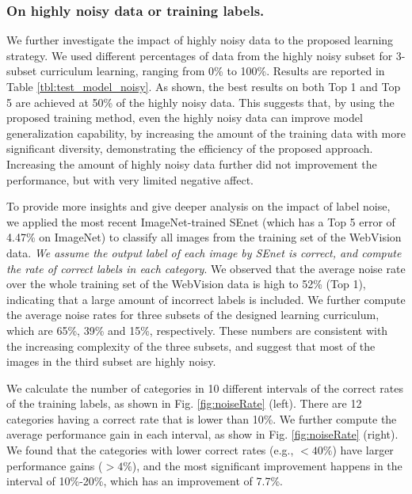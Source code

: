 \documentclass[runningheads]{llncs}
\begin{document}
\subsubsection{On highly noisy data or training labels.}
We further investigate the impact of highly noisy data to the proposed learning strategy. We used different percentages of data from the highly noisy subset for 3-subset curriculum learning, ranging from 0\% to 100\%. Results are reported in Table \ref{tbl:test_model_noisy}. As shown, the best results on both Top 1 and Top 5 are achieved at 50\% of the highly noisy data. This suggests that, by using the proposed training method, even the highly noisy data can improve model generalization capability, by increasing the amount of the training data with more significant diversity, demonstrating the efficiency of the proposed approach. Increasing the amount of highly noisy data further did not improvement the performance, but with very limited negative affect.

To provide more insights and give deeper analysis on the impact of label noise, we applied the most recent ImageNet-trained SEnet \cite{hu2017squeeze} (which has a Top 5 error of 4.47\%  on ImageNet) to classify all images from the training set of the WebVision data. \emph{We assume the output label of each image by SEnet is correct, and compute the rate of correct labels in each category}. We observed that the average noise rate over the whole training set of the WebVision data is high to 52\% (Top 1), indicating that a large amount of incorrect labels is included. We further compute the average noise rates for three subsets of the designed learning curriculum, which are 65\%, 39\% and 15\%, respectively. These numbers are consistent with the increasing complexity of the three subsets, and suggest that most of the images in the third subset are highly noisy.

We calculate the number of categories in 10 different intervals of the correct rates of the training labels, as shown in Fig. \ref{fig:noiseRate} (left). There are 12 categories having a correct rate that is lower than 10\%. We further compute the average performance gain in each interval, as show in Fig. \ref{fig:noiseRate} (right). We found that the categories with lower correct rates (e.g., $<40\%$) have larger performance gains ($>4\%$), and the most significant improvement happens in the interval of 10\%-20\%, which has an improvement of 7.7\%.
\begin{figure*}[tb]
\setlength{\abovecaptionskip}{-5pt}
\setlength{\belowcaptionskip}{-9pt}
\centering
{}
\vspace{-5mm}
\caption{Numbers of categories (left), and performance improvements (right) in 10 different rate intervals of the training labels.}
\label{fig:noiseRate}
\end{figure*}
\end{document}
